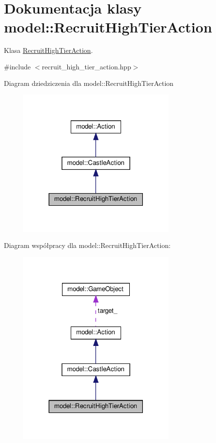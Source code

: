 \hypertarget{classmodel_1_1RecruitHighTierAction}{}\section{Dokumentacja klasy model\+:\+:Recruit\+High\+Tier\+Action}
\label{classmodel_1_1RecruitHighTierAction}


Klasa \hyperlink{classmodel_1_1RecruitHighTierAction}{Recruit\+High\+Tier\+Action}.  




{\ttfamily \#include $<$recruit\+\_\+high\+\_\+tier\+\_\+action.\+hpp$>$}



Diagram dziedziczenia dla model\+:\+:Recruit\+High\+Tier\+Action\nopagebreak
\begin{figure}[H]
\begin{center}
\leavevmode
\includegraphics[width=225pt]{classmodel_1_1RecruitHighTierAction__inherit__graph}
\end{center}
\end{figure}


Diagram współpracy dla model\+:\+:Recruit\+High\+Tier\+Action\+:\nopagebreak
\begin{figure}[H]
\begin{center}
\leavevmode
\includegraphics[width=225pt]{classmodel_1_1RecruitHighTierAction__coll__graph}
\end{center}
\end{figure}
